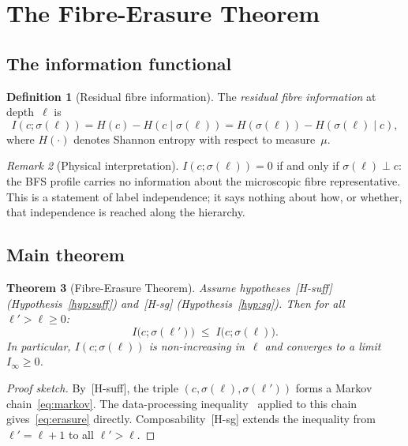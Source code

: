 \documentclass[11pt,a4paper]{article}
\theoremstyle{plain}
\newtheorem{theorem}{Theorem}[section]
\theoremstyle{definition}
\newtheorem{definition}[theorem]{Definition}
\theoremstyle{remark}
\newtheorem{remark}[theorem]{Remark}
\begin{document}
  \section{The Fibre-Erasure Theorem}
  \label{sec:erasure}

  \subsection{The information functional}

    \begin{definition}[Residual fibre information]
      \label{def:info}
      The \emph{residual fibre information} at depth~$\ell$ is
      \begin{equation}
        \label{eq:mutual}
        I(c;\sigma(\ell))
        = H(c) - H(c \mid \sigma(\ell))
        = H(\sigma(\ell)) - H(\sigma(\ell) \mid c),
      \end{equation}
      where $H(\cdot)$ denotes Shannon entropy with respect to measure~$\mu$.
    \end{definition}

    \begin{remark}[Physical interpretation]
      \label{rem:info-interp}
      $I(c;\sigma(\ell)) = 0$ if and only if $\sigma(\ell) \perp c$:
      the BFS profile carries no information about the microscopic fibre representative.
      This is a statement of label independence; it says nothing about how, or whether, that
      independence is reached along the hierarchy.
    \end{remark}

  \subsection{Main theorem}

    \begin{theorem}[Fibre-Erasure Theorem]
      \label{thm:erasure}
      Assume hypotheses~\textup{[H-suff]} (Hypothesis~\ref{hyp:suff})
      and~\textup{[H-sg]} (Hypothesis~\ref{hyp:sg}).
      Then for all $\ell' > \ell \geq 0$:
      \begin{equation}
        \label{eq:erasure}
        I\bigl(c;\sigma(\ell')\bigr) \;\leq\; I\bigl(c;\sigma(\ell)\bigr).
      \end{equation}
      In particular, $I(c;\sigma(\ell))$ is non-increasing in~$\ell$
      and converges to a limit $I_\infty \geq 0$.
    \end{theorem}

    \begin{proof}[Proof sketch]
By~\textup{[H-suff]}, the triple $(c,\sigma(\ell),\sigma(\ell'))$ forms
a Markov chain~\eqref{eq:markov}.
The data-processing inequality~\cite{CoverThomas2006}
applied to this chain gives~\eqref{eq:erasure} directly.
Composability~\textup{[H-sg]} extends the inequality from $\ell' = \ell + 1$
to all $\ell' > \ell$.
    \end{proof}
\end{document}
